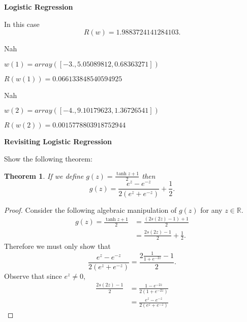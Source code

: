 \documentclass[letter]{article}
\newtheorem{theorem}{Theorem}
\newenvironment{menumerate}{%
  \edef\backupindent{\the\parindent}%
  \enumerate%
  \setlength{\parindent}{\backupindent}%
}{\endenumerate}
\begin{document}
\begin{menumerate}
  \item \textbf{Logistic Regression}
  \begin{menumerate}
    \item  In this case
    \begin{equation}
      R(w) = 1.9883724141284103.
     \end{equation} 
     \item Nah
     \item  $w(1) = array([-3. , 5.05089812, 0.68363271])$
     \item $R(w(1)) = 0.066133848540594925$ 
     \item Nah
     \item $w(2) =  array([-4. , 9.10179623, 1.36726541])$ 
     \item $R(w(2)) =  0.0015778803918752944$
  \end{menumerate}
  \item
  \item \textbf{Revisiting Logistic Regression}
  \begin{menumerate}
  	\item Show the following theorem:
  	\begin{theorem}
 		If we define $g(z) = \frac{\tanh z + 1}{2}$ then
 		\begin{equation}
 			g(z) = \frac{e^z - e^{-z}}{2(e^z + e^{-z})} + \frac{1}{2}.
 		\end{equation}
  	\end{theorem} 	
 		\begin{proof}
 			Consider the following algebraic manipulation of $g(z)$ for any $z \in \mathbb{R}.$
 			\begin{equation*}
 				\begin{aligned}
 					g(z) = \frac{\tanh z + 1}{2} &= \frac{(2s(2z) - 1) + 1}{2} \\
 					&= \frac{2s(2z) - 1}{2} + \frac{1}{2}.
 				\end{aligned}
 			\end{equation*}
 			Therefore we must only show that 
 			\begin{equation}
 				\frac{e^z -e^{-z}}{2(e^z+e^{-z})} = \frac{2\frac{1}{1+e^{-2z}}-1}{2}.
 			\end{equation}
 			Observe that since $e^z \neq 0$,
 			\begin{equation*}
 				\begin{aligned}
 					\frac{2s(2z)-1}{2} &= \frac{1 - e^{-2z}}{2(1+e^{-2z})} \\
 					&= \frac{e^z - e^{-z}}{2(e^z + e^{-z})}

\end{aligned}
\end{equation*}
\end{proof}
\end{menumerate}
\end{menumerate}
\end{document}
